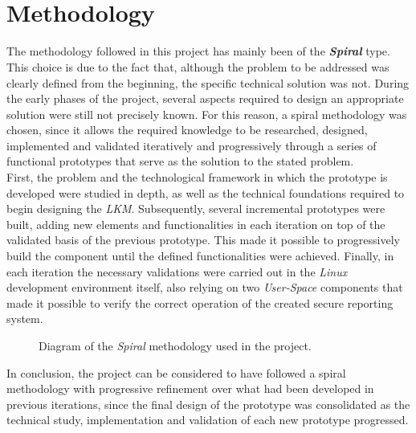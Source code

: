 \

\

\section{Methodology}

The methodology followed in this project has mainly been of the \textbf{\textit{Spiral}} type.
This choice is due to the fact that, although the problem to be addressed was clearly defined from the beginning, the specific technical solution was not.
During the early phases of the project, several aspects required to design an appropriate solution were still not precisely known.
For this reason, a spiral methodology was chosen, since it allows the required knowledge to be researched, designed, implemented and validated iteratively and progressively through a series of functional prototypes that serve as the solution to the stated problem.\\

First, the problem and the technological framework in which the prototype is developed were studied in depth, as well as the technical foundations required to begin designing the \textit{LKM}.
Subsequently, several incremental prototypes were built, adding new elements and functionalities in each iteration on top of the validated basis of the previous prototype. This made it possible to progressively build the component until the defined functionalities were achieved.
Finally, in each iteration the necessary validations were carried out in the \textit{Linux} development environment itself, also relying on two \textit{User-Space} components that made it possible to verify the correct operation of the created secure reporting system.\\

\begin{figure}[h!]
  \centering
  \scalebox{0.9}{}
  \caption{Diagram of the \textit{Spiral} methodology used in the project.}
  \label{fig:methodology_progression}
\end{figure}

In conclusion, the project can be considered to have followed a spiral methodology with progressive refinement over what had been developed in previous iterations, since the final design of the prototype was consolidated as the technical study, implementation and validation of each new prototype progressed.

\

